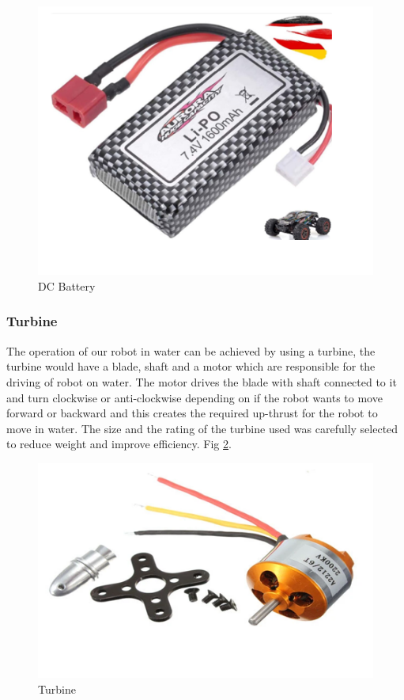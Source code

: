 \documentclass[10pt,journal,compsoc]{IEEEtran}
\begin{document}
\begin{figure}[h]
\includegraphics[scale=0.80]{battery}
\caption{DC Battery}
\label{fig:battery}
\end{figure}

\subsubsection{Turbine}

The operation of our robot in water can be achieved by using a turbine, the turbine would have a blade, shaft and a motor which are responsible for the driving of robot on water. The motor drives the blade with shaft connected to it and turn clockwise or anti-clockwise depending on if the robot wants to move forward or backward and this creates the required up-thrust for the robot to move in water. The size and the rating of the turbine used was carefully selected to reduce weight and improve efficiency. Fig \ref{fig:motturbine}.


\begin{figure}[h]
\includegraphics[scale=0.73]{motturbine}
\caption{Turbine}
\label{fig:motturbine}
\end{figure}
\end{document}

